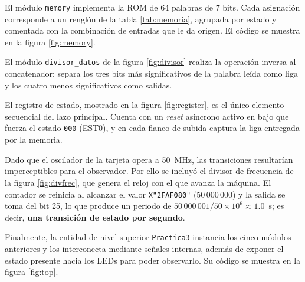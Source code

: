 
\label{fig:concat}

El módulo \texttt{memory} implementa la ROM de 64 palabras de 7 bits. Cada asignación
corresponde a un renglón de la tabla \ref{tab:memoria}, agrupada por estado y comentada
con la combinación de entradas que le da origen. El código se muestra en la figura
\ref{fig:memory}.


\label{fig:memory}

El módulo \texttt{divisor\_datos} de la figura \ref{fig:divisor} realiza la operación
inversa al concatenador: separa los tres bits más significativos de la palabra leída
como liga y los cuatro menos significativos como salidas.


\label{fig:divisor}

El registro de estado, mostrado en la figura \ref{fig:register}, es el único elemento
secuencial del lazo principal. Cuenta con un \textit{reset} asíncrono activo en bajo que
fuerza el estado \texttt{000} (EST0), y en cada flanco de subida captura la liga
entregada por la memoria.


\label{fig:register}

Dado que el oscilador de la tarjeta opera a 50~MHz, las transiciones resultarían
imperceptibles para el observador. Por ello se incluyó el divisor de frecuencia de la
figura \ref{fig:divfrec}, que genera el reloj con el que avanza la máquina. El contador
se reinicia al alcanzar el valor \texttt{X"2FAF080"} ($50\,000\,000$) y la salida se
toma del bit 25, lo que produce un periodo de
$50\,000\,001 / 50 \times 10^{6} \approx 1.0$~s; es decir, \textbf{una transición de
estado por segundo}.


\label{fig:divfrec}

Finalmente, la entidad de nivel superior \texttt{Practica3} instancia los cinco módulos
anteriores y los interconecta mediante señales internas, además de exponer el estado
presente hacia los LEDs para poder observarlo. Su código se muestra en la figura
\ref{fig:top}.

